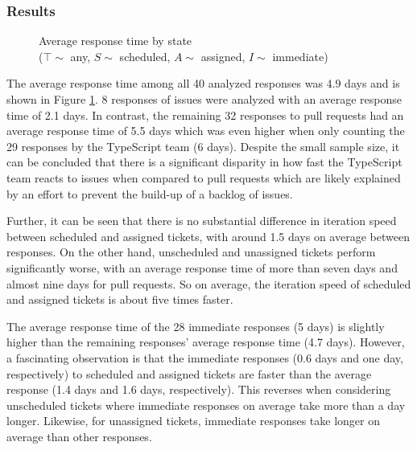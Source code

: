 \documentclass[12pt]{scrartcl}
\begin{document}
\subsubsection{Results}

\begin{figure}
    \centering
    \caption{Average response time by state \\ ($\top \sim$ any, $S \sim$ scheduled, $A \sim$ assigned, $I \sim$ immediate)}
    \label{fig:response_time_states}
\end{figure}

The average response time among all 40 analyzed responses was 4.9 days and is shown in Figure \ref{fig:response_time_states}. 8 responses of issues were analyzed with an average response time of 2.1 days. In contrast, the remaining 32 responses to pull requests had an average response time of 5.5 days which was even higher when only counting the 29 responses by the TypeScript team (6 days). Despite the small sample size, it can be concluded that there is a significant disparity in how fast the TypeScript team reacts to issues when compared to pull requests which are likely explained by an effort to prevent the build-up of a backlog of issues.

Further, it can be seen that there is no substantial difference in iteration speed between scheduled and assigned tickets, with around 1.5 days on average between responses. On the other hand, unscheduled and unassigned tickets perform significantly worse, with an average response time of more than seven days and almost nine days for pull requests. So on average, the iteration speed of scheduled and assigned tickets is about five times faster.

The average response time of the 28 immediate responses (5 days) is slightly higher than the remaining responses' average response time (4.7 days). However, a fascinating observation is that the immediate responses (0.6 days and one day, respectively) to scheduled and assigned tickets are faster than the average response (1.4 days and 1.6 days, respectively). This reverses when considering unscheduled tickets where immediate responses on average take more than a day longer. Likewise, for unassigned tickets, immediate responses take longer on average than other responses.
\end{document}
